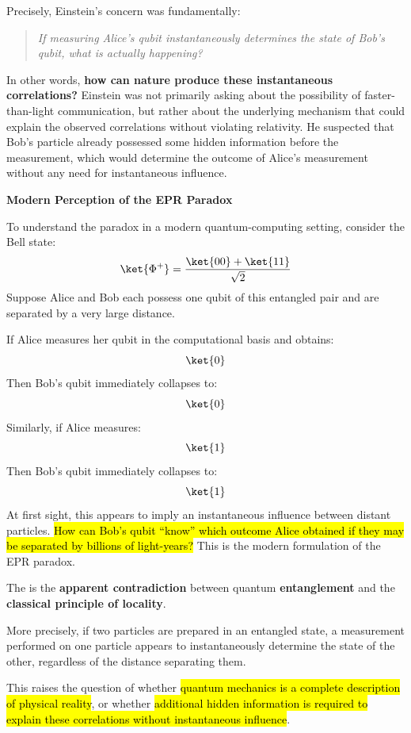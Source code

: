 \highspace
Precisely, Einstein's concern was fundamentally:
\begin{quote}
    \emph{If measuring Alice's qubit instantaneously determines the state of Bob's qubit, what is actually happening?}
\end{quote}
In other words, \textbf{how can nature produce these instantaneous correlations?} Einstein was not primarily asking about the possibility of faster-than-light communication, but rather about the underlying mechanism that could explain the observed correlations without violating relativity. He suspected that Bob's particle already possessed some hidden information before the measurement, which would determine the outcome of Alice's measurement without any need for instantaneous influence.

\highspace
\begin{flushleft}
    \textcolor{Green3}{ \textbf{Modern Perception of the EPR Paradox}}
\end{flushleft}
To understand the paradox in a modern quantum-computing setting, consider the Bell state:
\begin{equation*}
    \ket{\Phi^+}
    =
    \frac{\ket{00}+\ket{11}}{\sqrt2}
\end{equation*}
Suppose Alice and Bob each possess one qubit of this entangled pair and are separated by a very large distance.

\highspace
If Alice measures her qubit in the computational basis and obtains:
\begin{equation*}
    \ket{0}
\end{equation*}
Then Bob's qubit immediately collapses to:
\begin{equation*}
    \ket{0}
\end{equation*}
Similarly, if Alice measures:
\begin{equation*}
    \ket{1}
\end{equation*}
Then Bob's qubit immediately collapses to:
\begin{equation*}
    \ket{1}
\end{equation*}
At first sight, this appears to imply an instantaneous influence between distant particles. \hl{How can Bob's qubit ``know'' which outcome Alice obtained if they may be separated by billions of light-years?} This is the modern formulation of the EPR paradox.

\highspace
\begin{definitionbox}
    The  is the \textbf{apparent contradiction} between quantum \textbf{entanglement} and the \textbf{classical principle of locality}.

    \highspace
    More precisely, if two particles are prepared in an entangled state, a measurement performed on one particle appears to instantaneously determine the state of the other, regardless of the distance separating them.

    \highspace
    This raises the question of whether \hl{quantum mechanics is a complete description of physical reality}, or whether \hl{additional hidden information is required to explain these correlations without instantaneous influence}.
\end{definitionbox}